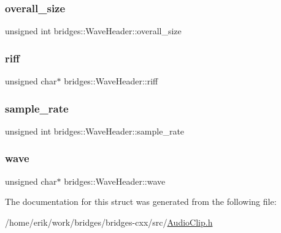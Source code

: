 \subsubsection{\texorpdfstring{overall\+\_\+size}{overall\_size}}
{\footnotesize\ttfamily unsigned int bridges\+::\+Wave\+Header\+::overall\+\_\+size}

\mbox{\label{structbridges_1_1_wave_header_a07827c91c0aba0a8a16789d2254864ab}} 
\subsubsection{\texorpdfstring{riff}{riff}}
{\footnotesize\ttfamily unsigned char$\ast$ bridges\+::\+Wave\+Header\+::riff}

\mbox{\label{structbridges_1_1_wave_header_a5dc65cbc1d601a5e613a4512f8add13f}} 
\subsubsection{\texorpdfstring{sample\+\_\+rate}{sample\_rate}}
{\footnotesize\ttfamily unsigned int bridges\+::\+Wave\+Header\+::sample\+\_\+rate}

\mbox{\label{structbridges_1_1_wave_header_aec8394e69b5f89efa30f6cac722dc8b8}} 
\subsubsection{\texorpdfstring{wave}{wave}}
{\footnotesize\ttfamily unsigned char$\ast$ bridges\+::\+Wave\+Header\+::wave}



The documentation for this struct was generated from the following file\+:\begin{DoxyCompactItemize}
\item 
/home/erik/work/bridges/bridges-\/cxx/src/\hyperlink{_audio_clip_8h}{Audio\+Clip.\+h}\end{DoxyCompactItemize}
